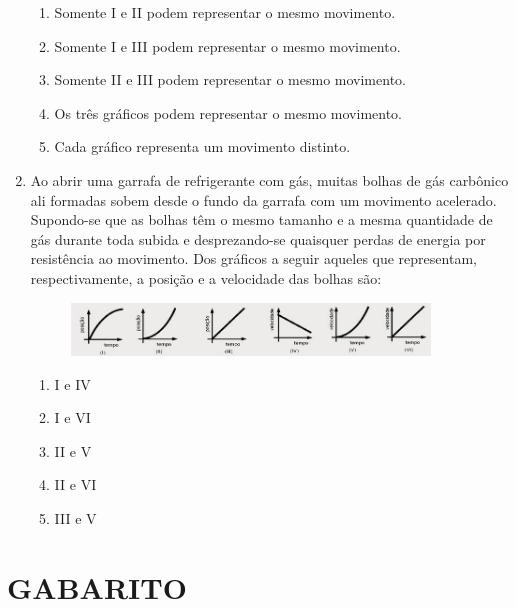 \documentclass[12pt,letterpaper,fleqn]{article}
\begin{document}
\begin{enumerate}
    \begin{enumerate}
        \item Somente I e II podem representar o mesmo movimento. 
        \item Somente I e III podem representar o mesmo movimento.
        \item Somente II e III podem representar o mesmo movimento.
        \item Os três gráficos podem representar o mesmo movimento.
        \item Cada gráfico representa um movimento distinto.
    \end{enumerate}
    
    \item  Ao abrir uma garrafa de refrigerante com gás, muitas bolhas de gás carbônico ali formadas sobem desde o fundo da garrafa com um movimento acelerado. Supondo-se que as bolhas têm o mesmo tamanho e a mesma quantidade de gás durante toda subida e desprezando-se quaisquer perdas de energia por resistência ao movimento. Dos gráficos a seguir aqueles que representam, respectivamente, a posição e a velocidade das bolhas são:
    
    \begin{figure}[H]
        \centering
        \includegraphics[width=0.9\textwidth]{last.jpg}
        \label{fig:ex_9}
    \end{figure}
    
    \begin{enumerate}
        \item I e IV
        \item I e VI
        \item II e V
        \item II e VI
        \item III e V
    \end{enumerate}
\end{enumerate}
\newpage
\section{GABARITO}
\end{document}
